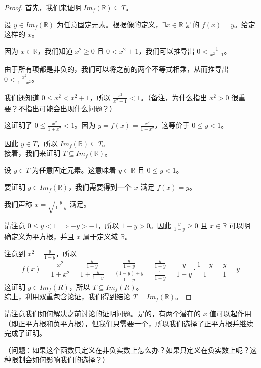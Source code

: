 \begin{example}
    \begin{proof}
        首先，我们来证明 $Im_f (\mathbb{R}) \subseteq T$。

        设 $y \in Im_f (\mathbb{R})$ 为任意固定元素。根据像的定义，$\exists x \in \mathbb{R}$ 是的 $f(x) = y$。给定这样的 $x$。

        因为 $x \in \mathbb{R}$，我们知道 $x^2 \ge 0$ 且 $0 < x^2+1$，我们可以推导出 $0 < \frac{1}{x^2+1}$。

        由于所有项都是非负的，我们可以将之前的两个不等式相乘，从而推导出 $0 < \frac{x^2}{1+x^2}$。

        我们还知道 $0 \le x^2 < x^2 + 1$，所以 $\frac{x^2}{x^2+1}<1$。（备注，为什么指出 $x^2>0$ 很重要？不指出可能会出现什么问题？）

        这证明了 $0 \le \frac{x^2}{1+x^2} < 1$。因为 $y = f(x) = \frac{x^2}{1+x^2}$，这等价于 $0 \le y < 1$。

        因此 $y \in T$，所以 $Im_f (\mathbb{R}) \subseteq T$。\\

        接着，我们来证明 $T \subseteq Im_f (\mathbb{R})$。

        设 $y \in T$ 为任意固定元素。这意味着 $y \in \mathbb{R}$ 且 $0 \le y < 1$。

        要证明 $y \in Im_f (\mathbb{R})$，我们需要得到一个 $x$ 满足 $f(x) = y$。

        我们声称 $x = \sqrt{\frac{y}{1-y}}$ 满足。

        请注意 $0 \le y < 1 \implies -y > -1$，所以 $1-y > 0$。因此 $\frac{y}{1-y} \ge 0$ 且 $x \in \mathbb{R}$ 可以明确定义为平方根，并且 $x$ 属于定义域 $\mathbb{R}$。
        
        注意到 $x^2=\frac{y}{1-y}$，所以
        \[f(x) = \frac{x^2}{1+x^2} = \frac{\frac{y}{1-y}}{1+\frac{y}{1-y}}=\frac{\frac{y}{1-y}}{\frac{(1-y)+y}{1-y}}=\frac{\frac{y}{1-y}}{\frac{1}{1-y}}=\frac{y}{1-y} \cdot \frac{1-y}{1} = \frac{y}{1} = y\]
        这证明 $y \in Im_f (R)$，所以 $T \subseteq Im_f (R)$。\\

        综上，利用双重包含论证，我们得到结论 $T = Im_f (\mathbb{R})$。
    \end{proof}
\end{example}

请注意我们如何解决之前讨论的证明问题。是的，有两个潜在的 $x$ 值可以起作用（即正平方根和负平方根），但我们只需要一个，所以我们选择了正平方根并继续完成了证明。

（问题：如果这个函数只定义在非负实数上怎么办？如果只定义在负实数上呢？这种限制会如何影响我们的选择？）\\

